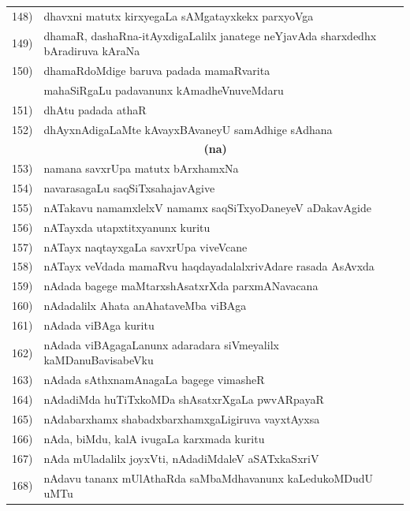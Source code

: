 {\begin{longtable}{@{}cp{7.4cm}r}
148) & dhavxni matutx kirxyegaLa sAMgatayxkekx parxyoVga & \pageref{page120}\\
149) & dhamaR, dashaRna-itAyxdigaLalilx janatege neYjavAda sharxdedhx bAradiruva kAraNa & \pageref{page50}\\
150) & dhamaRdoMdige baruva padada mamaRvarita  & \\
     & mahaSiRgaLu padavanunx kAmadheVnuveMdaru & \pageref{page205}\\
151) & dhAtu padada athaR & \pageref{page1} \\
152) & dhAyxnAdigaLaMte kAvayxBAvaneyU samAdhige sAdhana & \pageref{page231}\\[0.3cm]
     &    \multicolumn{1}{c}{\textbf{(na)}}  & \\[0.3cm] 
153) & namana savxrUpa matutx bArxhamxNa & \pageref{page84}\\
154) & navarasagaLu saqSiTxsahajavAgive & \pageref{page222}\\
155) & nATakavu namamxlelxV namamx saqSiTxyoDaneyeV aDakavAgide & \pageref{page242}\\
156) & nATayxda utapxtitxyanunx kuritu & \pageref{page242}\\
157) & nATayx naqtayxgaLa savxrUpa viveVcane &  \pageref{page241}\\
158) & nATayx veVdada mamaRvu haqdayadalalxrivAdare rasada AsAvxda & \pageref{page244}\\
159) & nAdada bagege maMtarxshAsatxrXda parxmANavacana & \pageref{page159}\\
160) & nAdadalilx Ahata anAhataveMba viBAga & \pageref{page164}\\
161) & nAdada viBAga kuritu & \pageref{page158}\\
162) & nAdada viBAgagaLanunx adaradara siVmeyalilx kaMDanuBavisa\break beVku & \pageref{page173}\\
163) & nAdada sAthxnamAnagaLa bagege vimasheR & \pageref{page158}\\
164) & nAdadiMda huTiTxkoMDa shAsatxrXgaLa pwvARpayaR & \pageref{page175}\\
165) & nAdabarxhamx shabadxbarxhamxgaLigiruva vayxtAyxsa & \pageref{page160}\\
166) & nAda, biMdu, kalA ivugaLa karxmada kuritu & \pageref{page177}\\
167) & nAda mUladalilx joyxVti, nAdadiMdaleV aSATxkaSxriV & \pageref{page172}\\
168) & nAdavu tananx mUlAthaRda saMbaMdhavanunx kaLedu\break koMDudU uMTu & \pageref{page178}\\

\end{longtable}}
